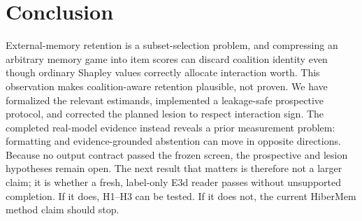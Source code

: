 \section{Conclusion}

External-memory retention is a subset-selection problem, and compressing an
arbitrary memory game into item scores can discard coalition identity even though
ordinary Shapley values correctly allocate interaction worth. This observation makes
coalition-aware retention plausible, not proven. We have formalized the relevant
estimands, implemented a leakage-safe prospective protocol, and corrected the
planned lesion to respect interaction sign. The completed real-model evidence
instead reveals a prior measurement problem: formatting and evidence-grounded
abstention can move in opposite directions. Because no output contract passed the
frozen screen, the prospective and lesion hypotheses remain open. The next result
that matters is therefore not a larger claim; it is whether a fresh, label-only E3d
reader passes without unsupported completion. If it does, H1--H3 can be tested. If
it does not, the current HiberMem method claim should stop.
